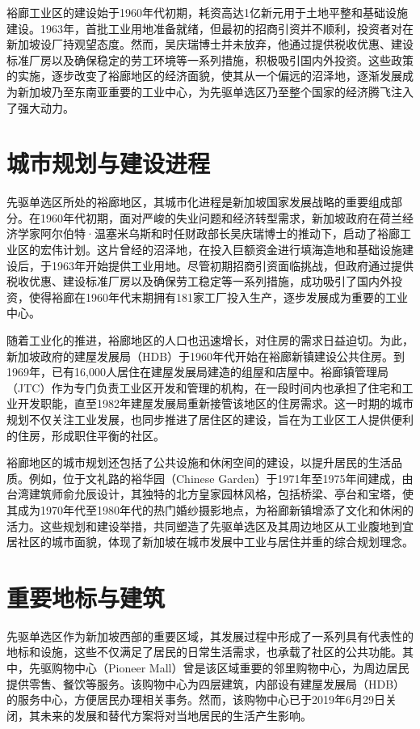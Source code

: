 \documentclass[11pt,a4paper,twoside,openany]{book}
\begin{document}
裕廊工业区的建设始于1960年代初期，耗资高达1亿新元用于土地平整和基础设施建设。1963年，首批工业用地准备就绪，但最初的招商引资并不顺利，投资者对在新加坡设厂持观望态度。然而，吴庆瑞博士并未放弃，他通过提供税收优惠、建设标准厂房以及确保稳定的劳工环境等一系列措施，积极吸引国内外投资。这些政策的实施，逐步改变了裕廊地区的经济面貌，使其从一个偏远的沼泽地，逐渐发展成为新加坡乃至东南亚重要的工业中心，为先驱单选区乃至整个国家的经济腾飞注入了强大动力。

\section{城市规划与建设进程}
先驱单选区所处的裕廊地区，其城市化进程是新加坡国家发展战略的重要组成部分。在1960年代初期，面对严峻的失业问题和经济转型需求，新加坡政府在荷兰经济学家阿尔伯特·温塞米乌斯和时任财政部长吴庆瑞博士的推动下，启动了裕廊工业区的宏伟计划。这片曾经的沼泽地，在投入巨额资金进行填海造地和基础设施建设后，于1963年开始提供工业用地。尽管初期招商引资面临挑战，但政府通过提供税收优惠、建设标准厂房以及确保劳工稳定等一系列措施，成功吸引了国内外投资，使得裕廊在1960年代末期拥有181家工厂投入生产，逐步发展成为重要的工业中心。

随着工业化的推进，裕廊地区的人口也迅速增长，对住房的需求日益迫切。为此，新加坡政府的建屋发展局（HDB）于1960年代开始在裕廊新镇建设公共住房。到1969年，已有16,000人居住在建屋发展局建造的组屋和店屋中。裕廊镇管理局（JTC）作为专门负责工业区开发和管理的机构，在一段时间内也承担了住宅和工业开发职能，直至1982年建屋发展局重新接管该地区的住房需求。这一时期的城市规划不仅关注工业发展，也同步推进了居住区的建设，旨在为工业区工人提供便利的住房，形成职住平衡的社区。

裕廊地区的城市规划还包括了公共设施和休闲空间的建设，以提升居民的生活品质。例如，位于文礼路的裕华园（Chinese Garden）于1971年至1975年间建成，由台湾建筑师俞允辰设计，其独特的北方皇家园林风格，包括桥梁、亭台和宝塔，使其成为1970年代至1980年代的热门婚纱摄影地点，为裕廊新镇增添了文化和休闲的活力。这些规划和建设举措，共同塑造了先驱单选区及其周边地区从工业腹地到宜居社区的城市面貌，体现了新加坡在城市发展中工业与居住并重的综合规划理念。

\section{重要地标与建筑}
先驱单选区作为新加坡西部的重要区域，其发展过程中形成了一系列具有代表性的地标和设施，这些不仅满足了居民的日常生活需求，也承载了社区的公共功能。其中，先驱购物中心（Pioneer Mall）曾是该区域重要的邻里购物中心，为周边居民提供零售、餐饮等服务。该购物中心为四层建筑，内部设有建屋发展局（HDB）的服务中心，方便居民办理相关事务。然而，该购物中心已于2019年6月29日关闭，其未来的发展和替代方案将对当地居民的生活产生影响。
\end{document}
